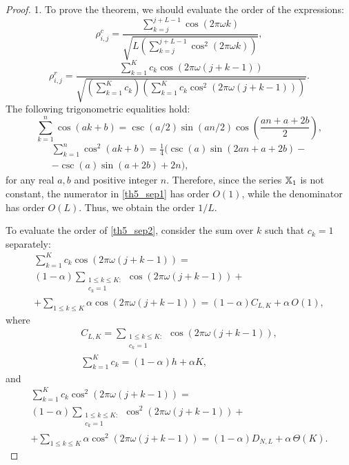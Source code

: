 \documentclass[sii]{ipart}
\begin{document}
\begin{proof}
1. To prove the theorem, we should evaluate the order of the expressions:
	\begin{equation}\label{th5_sep1}
	\rho^c_{i,j} = \frac{\sum_{k=j}^{j + L - 1} \cos(2 \pi \omega k)}{\sqrt{L \left(\sum_{k=j}^{j + L - 1} \cos^2(2 \pi \omega k)\right)}},
	\end{equation}
	\begin{equation}\label{th5_sep2}
	\rho^r_{i,j} = \frac{\sum_{k=1}^K c_k\cos(2 \pi \omega (j + k - 1))}{\sqrt{\left(\sum_{k=1}^K c_k\right) \left(\sum_{k=1}^K c_k\cos^2(2 \pi \omega (j + k - 1))\right)}}.
	\end{equation}
	The following trigonometric equalities hold:
	\begin{equation}
	\label{sumcos}
	\sum_{k=1}^n \cos(ak + b) = \csc(a/2) \sin(an / 2) \cos \left(\frac{an + a + 2b}{2} \right), 
	\end{equation}
	\begin{multline}
	\label{sumsqcos}
	\sum_{k=1}^n \cos^2(ak + b) = \frac{1}{4}(\csc(a) \sin(2an + a + 2b) -\\ - \csc(a)\sin(a + 2b) + 2n),
	\end{multline}
	for any real $a, b$ and positive integer $n$.
	Therefore, since the series $\mathbb{X}_1$ is not constant, the numerator in \eqref{th5_sep1} has order $O(1)$, while the denominator has order $O(L)$. Thus, we obtain the order $1/L$.
	
	To evaluate the order of \eqref{th5_sep2}, consider the sum over $k$ such that $c_k=1$ separately:
	\begin{multline*}
	\sum_{k=1}^K c_k\cos(2 \pi \omega (j + k - 1)) = \\ (1-\alpha) \sum_{\substack{1 \le k \le K: \\ c_k = 1}}\cos(2 \pi \omega (j + k - 1)) +\\ +\sum_{1 \le k \le K}\alpha \cos(2 \pi \omega (j + k - 1)) = (1-\alpha) C_{L,K} + \alpha\, O(1),
	\end{multline*}
where
    \begin{gather*}
	C_{L, K} = \sum_{\substack{1 \le k \le K: \\ c_k = 1}}\cos(2 \pi \omega (j + k - 1)),
	\\
	\sum_{k=1}^K c_k = (1-\alpha) h + \alpha K,
	\end{gather*}
and
    \begin{multline*}
	\sum_{k=1}^K c_k\cos^2(2 \pi \omega (j + k - 1)) = \\ (1-\alpha)\sum_{\substack{1 \le k \le K: \\ c_k = 1}}\cos^2(2 \pi \omega (j + k - 1)) +\\ +\sum_{1 \le k \le K }\alpha \cos^2(2 \pi \omega (j + k - 1)) = (1-\alpha) D_{N,L} + \alpha\, \Theta(K).
    \end{multline*}


\end{proof}
\end{document}
